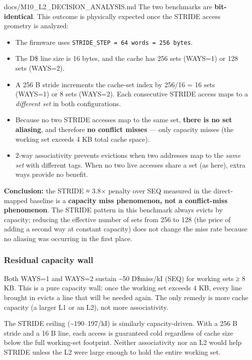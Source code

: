 \begin{relocated}{docs/M10_L2_DECISION_ANALYSIS.md}
The two benchmarks are \textbf{bit-identical}. This outcome is
physically expected once the STRIDE access geometry is analyzed:

\begin{itemize}
\tightlist
\item
  The  firmware uses
  \texttt{STRIDE\_\allowbreak{}STEP\ =\allowbreak{}\ 64\ words\ =\allowbreak{}\ 256\ bytes}.
\item
  The D\$ line size is 16 bytes, and the cache has 256 sets (WAYS=1) or
  128 sets (WAYS=2).
\item
  A 256 B stride increments the cache-set index by 256/16 = 16 sets
  (WAYS=1) or 8 sets (WAYS=2). Each consecutive STRIDE access maps to a
  \emph{different set} in both configurations.
\item
  Because no two STRIDE accesses map to the same set, \textbf{there is
  no set aliasing}, and therefore \textbf{no conflict misses} --- only
  capacity misses (the working set exceeds 4 KB total cache space).
\item
  2-way associativity prevents evictions when two addresses map to the
  \emph{same set} with different tags. When no two live accesses share a
  set (as here), extra ways provide no benefit.
\end{itemize}

\textbf{Conclusion:} the STRIDE ≈ 3.8× penalty over SEQ measured in the
direct-mapped baseline is a \textbf{capacity miss phenomenon, not a
conflict-miss phenomenon}. The STRIDE pattern in this benchmark always
evicts by capacity; reducing the effective number of sets from 256 to
128 (the price of adding a second way at constant capacity) does not
change the miss rate because no aliasing was occurring in the first
place.

\subsubsection{Residual capacity wall}\label{tm:dec:m10-l2:53-residual-capacity-wall}

Both WAYS=1 and WAYS=2 sustain \textasciitilde50 D\$miss/kI (SEQ) for
working sets ≥ 8 KB. This is a pure capacity wall: once the working set
exceeds 4 KB, every line brought in evicts a line that will be needed
again. The only remedy is more cache capacity (a larger L1 or an L2),
not more associativity.

The STRIDE ceiling (\textasciitilde190--197/\allowbreak{}kI) is
similarly capacity-driven. With a 256 B stride and a 16 B line, each
access is guaranteed cold regardless of cache size below the full
working-set footprint. Neither associativity nor an L2 would help STRIDE
unless the L2 were large enough to hold the entire working set.


\end{relocated}
